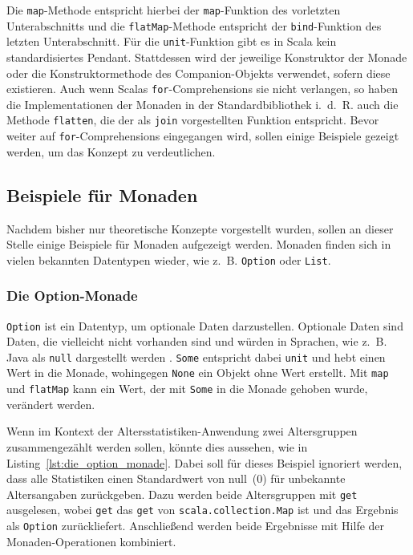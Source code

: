 Die \lstinline|map|-Methode entspricht hierbei der \lstinline|map|-Funktion des vorletzten Unterabschnitts und die \lstinline|flatMap|-Methode entspricht der \lstinline|bind|-Funktion des letzten Unterabschnitt.
Für die \lstinline|unit|-Funktion gibt es in Scala kein standardisiertes Pendant.
Stattdessen wird der jeweilige Konstruktor der Monade oder die Konstruktormethode des Companion-Objekts verwendet, sofern diese existieren.
Auch wenn Scalas \lstinline|for|-Comprehensions sie nicht verlangen, so haben die Implementationen der Monaden in der Standardbibliothek i.~d.~R. auch die Methode \lstinline|flatten|, die der als \lstinline|join| vorgestellten Funktion entspricht.
Bevor weiter auf \lstinline|for|-Comprehensions eingegangen wird, sollen einige Beispiele gezeigt werden, um das Konzept zu verdeutlichen.


\subsection{Beispiele für Monaden} %
\label{sub:beispiele_fuer_monaden}

Nachdem bisher nur theoretische Konzepte vorgestellt wurden, sollen an dieser Stelle einige Beispiele für Monaden aufgezeigt werden.
Monaden finden sich in vielen bekannten Datentypen wieder, wie z.~B. \lstinline|Option| oder \lstinline|List|.

\subsubsection{Die Option-Monade} %
\label{ssub:die_option_monade}

\lstinline|Option| ist ein Datentyp, um optionale Daten darzustellen.
Optionale Daten sind Daten, die vielleicht nicht vorhanden sind und würden in Sprachen, wie z.~B. Java als \lstinline|null| dargestellt werden \cite[vgl.][S.~289]{programming_in_scala}.
\lstinline|Some| entspricht dabei \lstinline|unit| und hebt einen Wert in die Monade, wohingegen \lstinline|None| ein Objekt ohne Wert erstellt.
Mit \lstinline|map| und \lstinline|flatMap| kann ein Wert, der mit \lstinline|Some| in die Monade gehoben wurde, verändert werden.

Wenn im Kontext der Altersstatistiken-Anwendung zwei Altersgruppen zusammengezählt werden sollen, könnte dies aussehen, wie in Listing~\ref{lst:die_option_monade}.
Dabei soll für dieses Beispiel ignoriert werden, dass alle Statistiken einen Standardwert von null~(0) für unbekannte Altersangaben zurückgeben.
Dazu werden beide Altersgruppen mit \lstinline|get| ausgelesen, wobei \lstinline|get| das \lstinline|get| von \lstinline|scala.collection.Map| ist und das Ergebnis als \lstinline|Option| zurückliefert.
Anschließend werden beide Ergebnisse mit Hilfe der Monaden-Operationen kombiniert.

